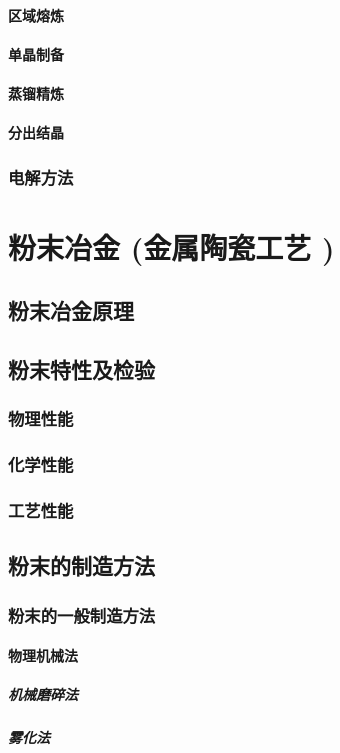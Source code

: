 \documentclass[UTF8]{../../ApplicationUniverse}
\begin{document}
            \paragraph{区域熔炼}
            \paragraph{单晶制备}
            \paragraph{蒸镏精炼}
            \paragraph{分出结晶}
        \subsubsection{电解方法}
\section{粉末冶金 (金属陶瓷工艺 )}
    \subsection{粉末冶金原理}
    \subsection{粉末特性及检验}
        \subsubsection{物理性能}
        \subsubsection{化学性能}
        \subsubsection{工艺性能}
    \subsection{粉末的制造方法}
        \subsubsection{粉末的一般制造方法}
            \paragraph{物理机械法}
                \subparagraph{机械磨碎法}
                \subparagraph{雾化法}
\end{document}
